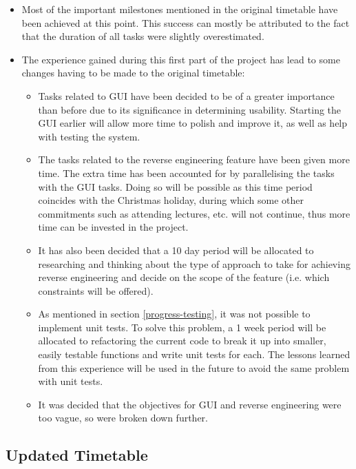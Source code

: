 \documentclass{article}
\begin{document}
	\begin{itemize}
		\item Most of the important milestones mentioned in the original timetable have been achieved at this point. This success can mostly be attributed to the fact that the duration of all tasks were slightly overestimated.
		\item The experience gained during this first part of the project has lead to some changes having to be made to the original timetable:
		\begin{itemize}
			\item Tasks related to GUI have been decided to be of a greater importance than before due to its significance in determining usability. Starting the GUI earlier will allow more time to polish and improve it, as well as help with testing the system.
			\item The tasks related to the reverse engineering feature have been given more time. The extra time has been accounted for by parallelising the tasks with the GUI tasks. Doing so will be possible as this time period coincides with the Christmas holiday, during which some other commitments such as attending lectures, etc. will not continue, thus more time can be invested in the project.
			\item It has also been decided that a 10 day period will be allocated to researching and thinking about the type of approach to take for achieving reverse engineering and decide on the scope of the feature (i.e. which constraints will be offered).
			\item As mentioned in section \ref{progress-testing}, it was not possible to implement unit tests. To solve this problem, a 1 week period will be allocated to refactoring the current code to break it up into smaller, easily testable functions and write unit tests for each. The lessons learned from this experience will be used in the future to avoid the same problem with unit tests.
			
			\item It was decided that the objectives for GUI and reverse engineering were too vague, so were broken down further.
		\end{itemize}
		
	\end{itemize}
	
	\subsection{Updated Timetable}
	
\end{document}
